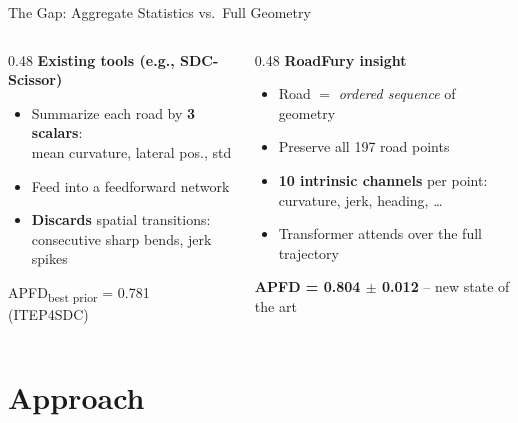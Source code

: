 \documentclass[aspectratio=169,10pt]{beamer}
\newcommand{\hlg}[1]{\textcolor{successgreen}{\textbf{#1}}}
\newcommand{\hlr}[1]{\textcolor{alertred}{\textbf{#1}}}
\begin{document}
\begin{frame}{The Gap: Aggregate Statistics vs.\ Full Geometry}
  \begin{columns}[T]
    \begin{column}{0.48\linewidth}
      \textbf{\hlr{Existing tools (e.g., SDC-Scissor)}}
      \vspace{5pt}
      \begin{itemize}
        \item Summarize each road by \textbf{3 scalars}:\\
              mean curvature, lateral pos., std
        \item Feed into a feedforward network
        \item \textbf{Discards} spatial transitions:\\
              consecutive sharp bends, jerk spikes
      \end{itemize}
      \vspace{10pt}
      {\small APFD\textsubscript{best prior} = 0.781 (ITEP4SDC)}
    \end{column}
    \begin{column}{0.48\linewidth}
      \textbf{\hlg{RoadFury insight}}
      \vspace{5pt}
      \begin{itemize}
        \item Road $=$ \emph{ordered sequence} of geometry
        \item Preserve all 197 road points
        \item \textbf{10 intrinsic channels} per point:\\
              curvature, jerk, heading, \ldots
        \item Transformer attends over the full trajectory
      \end{itemize}
      \vspace{10pt}
      {\small \hlg{APFD = 0.804 $\pm$ 0.012} -- new state of the art}
    \end{column}
  \end{columns}
\end{frame}

\section{Approach}
\end{document}
